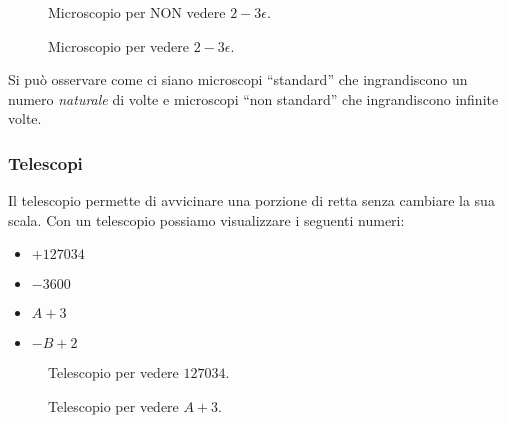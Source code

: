\begin{figure}[h]
\begin{inaccessibleblock}

\begin{minipage}{.48\linewidth}
 \begin{center}
\microscopioc
 \end{center}
\caption{Microscopio per NON vedere \(2-3\epsilon\).} \label{fig:microscopioc}
\end{minipage}
\hfill
\begin{minipage}{.48\linewidth}
 \begin{center}
\microscopiod
 \end{center}
\caption{Microscopio per vedere \(2-3\epsilon\).} \label{fig:microscopiod}
\end{minipage}

\end{inaccessibleblock}
\end{figure}
 
Si può osservare come ci siano microscopi ``standard'' che ingrandiscono un 
numero \emph{naturale} di volte e microscopi ``non standard'' che ingrandiscono 
infinite volte.

\subsubsection{Telescopi}
\label{subsec:insnum_microscopio}

Il telescopio permette di avvicinare una porzione di retta senza cambiare la 
sua scala. 
Con un telescopio possiamo visualizzare i seguenti numeri:

\begin{multicols}{4}
\begin{itemize}[nosep]
 \item $+127034$
 \item $-3600$
 \item $A+3$
 \item $-B+2$
\end{itemize}
\end{multicols}
\vspace{-5mm}
\begin{figure}[h]
\begin{inaccessibleblock}

\begin{minipage}{.48\linewidth}
 \begin{center}
\telescopioa
 \end{center}
\caption{Telescopio per vedere \(127034\).} \label{fig:telescopioa}
\end{minipage}
\hfill
\begin{minipage}{.48\linewidth}
 \begin{center}
\telescopiob
 \end{center}
\caption{Telescopio per vedere \(A+3\).} \label{fig:telescopiob}
\end{minipage}

\end{inaccessibleblock}
\end{figure}

